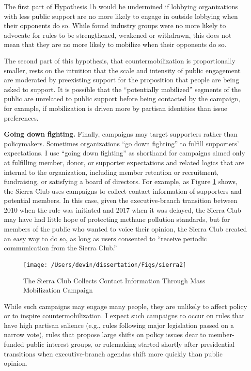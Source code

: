 \documentclass[
      12pt,
        ]{article}
\begin{document}
The first part of Hypothesis 1b would be undermined if lobbying organizations
with less public support are no more likely to engage in outside
lobbying when their opponents do so. While \citet{Potter2017} found industry
groups were no more likely to advocate for rules to be strengthened,
weakened or withdrawn, this does not mean that they are no more likely
to mobilize when their opponents do so.

The second part of this hypothesis, that countermobilization is
proportionally smaller, rests on the intuition that the scale and
intensity of public engagement are moderated by preexisting support for
the proposition that people are being asked to support. It is possible
that the ``potentially mobilized'' segments of the public are unrelated to
public support before being contacted by the campaign, for example, if
mobilization is driven more by partisan identities than issue
preferences.

\textbf{Going down fighting.} Finally, campaigns may target supporters rather
than policymakers. Sometimes organizations ``go down fighting'' to fulfill
supporters' expectations. I use ``going down fighting'' as shorthand for
campaigns aimed only at fulfilling member, donor, or supporter
expectations and related logics that are internal to the organization,
including member retention or recruitment, fundraising, or satisfying a
board of directors. For example, as Figure
\ref{fig:sierra} shows, the Sierra Club uses campaigns to collect
contact information of supporters and potential members. In this case,
given the executive-branch transition between 2010 when the rule was
initiated and 2017 when it was delayed, the Sierra Club may have had
little hope of protecting methane pollution standards, but for members
of the public who wanted to voice their opinion, the Sierra Club created
an easy way to do so, as long as users consented to ``receive periodic
communication from the Sierra Club.''

\begin{figure}

{\centering \texttt{[image: /Users/devin/dissertation/Figs/sierra2]} 

}

\caption{The Sierra Club Collects Contact Information Through Mass Mobilization Campaign}\label{fig:sierra}
\end{figure}

While such campaigns may engage many people, they are unlikely to affect
policy or to inspire countermobilization. I expect such campaigns to
occur on rules that have high partisan salience (e.g., rules following
major legislation passed on a narrow vote), rules that propose large
shifts on policy issues dear to member-funded public interest groups, or
rulemaking started shortly after presidential transitions when
executive-branch agendas shift more quickly than public opinion.
\end{document}
